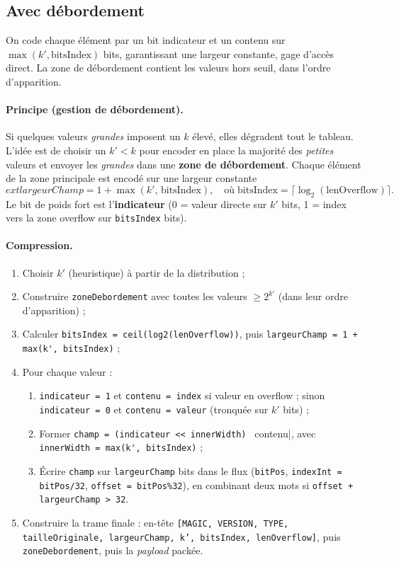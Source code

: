 \subsection{Avec débordement}
On code chaque élément par un bit indicateur et un contenu sur $\max(k',\text{bitsIndex})$ bits, garantissant une largeur constante, gage d'accès direct. La zone de débordement contient les valeurs hors seuil, dans l'ordre d'apparition.

\paragraph{Principe (gestion de débordement).}
Si quelques valeurs \emph{grandes} imposent un $k$ élevé, elles dégradent tout le tableau. L'idée est de choisir un $k' < k$ pour encoder en place la majorité des \emph{petites} valeurs et envoyer les \emph{grandes} dans une \textbf{zone de débordement}. Chaque élément de la zone principale est encodé sur une largeur constante
\[
 	ext{largeurChamp} = 1 + \max(k',\,\text{bitsIndex}),\quad \text{où}\;\text{bitsIndex}=\lceil\log_2(\text{lenOverflow})\rceil.
\]
Le bit de poids fort est l'\textbf{indicateur} (0 = valeur directe sur $k'$ bits, 1 = index vers la zone overflow sur \texttt{bitsIndex} bits).

\paragraph{Compression.}
\begin{enumerate}
  \item Choisir $k'$ (heuristique) à partir de la distribution ;
  \item Construire \verb|zoneDebordement| avec toutes les valeurs $\ge 2^{k'}$ (dans leur ordre d'apparition) ;
  \item Calculer \verb|bitsIndex = ceil(log2(lenOverflow))|, puis \verb|largeurChamp = 1 + max(k', bitsIndex)| ;
  \item Pour chaque valeur :
  \begin{enumerate}
    \item \verb|indicateur = 1| et \verb|contenu = index| si valeur en overflow ; sinon \verb|indicateur = 0| et \verb|contenu = valeur| (tronquée sur $k'$ bits) ;
    \item Former \verb|champ = (indicateur << innerWidth) | contenu|, avec \verb|innerWidth = max(k', bitsIndex)| ;
    \item Écrire \verb|champ| sur \verb|largeurChamp| bits dans le flux (\verb|bitPos|, \verb|indexInt = bitPos/32|, \verb|offset = bitPos%32|), en combinant deux mots si \verb|offset + largeurChamp > 32|.
  \end{enumerate}
  \item Construire la trame finale : en-tête \texttt{[MAGIC, VERSION, TYPE, tailleOriginale, largeurChamp, k', bitsIndex, lenOverflow]}, puis \verb|zoneDebordement|, puis la \emph{payload} packée.
\end{enumerate}

